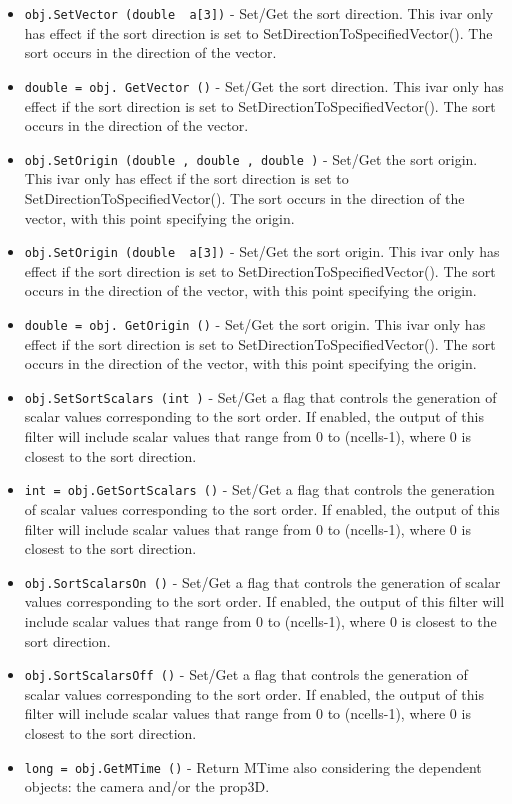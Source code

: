 \begin{itemize}
\item  \verb|obj.SetVector (double  a[3])| -  Set/Get the sort direction. This ivar only has effect if the sort
 direction is set to SetDirectionToSpecifiedVector(). The sort occurs
 in the direction of the vector.

\item  \verb|double = obj. GetVector ()| -  Set/Get the sort direction. This ivar only has effect if the sort
 direction is set to SetDirectionToSpecifiedVector(). The sort occurs
 in the direction of the vector.

\item  \verb|obj.SetOrigin (double , double , double )| -  Set/Get the sort origin. This ivar only has effect if the sort
 direction is set to SetDirectionToSpecifiedVector(). The sort occurs
 in the direction of the vector, with this point specifying the
 origin.

\item  \verb|obj.SetOrigin (double  a[3])| -  Set/Get the sort origin. This ivar only has effect if the sort
 direction is set to SetDirectionToSpecifiedVector(). The sort occurs
 in the direction of the vector, with this point specifying the
 origin.

\item  \verb|double = obj. GetOrigin ()| -  Set/Get the sort origin. This ivar only has effect if the sort
 direction is set to SetDirectionToSpecifiedVector(). The sort occurs
 in the direction of the vector, with this point specifying the
 origin.

\item  \verb|obj.SetSortScalars (int )| -  Set/Get a flag that controls the generation of scalar values
 corresponding to the sort order. If enabled, the output of this
 filter will include scalar values that range from 0 to (ncells-1),
 where 0 is closest to the sort direction.

\item  \verb|int = obj.GetSortScalars ()| -  Set/Get a flag that controls the generation of scalar values
 corresponding to the sort order. If enabled, the output of this
 filter will include scalar values that range from 0 to (ncells-1),
 where 0 is closest to the sort direction.

\item  \verb|obj.SortScalarsOn ()| -  Set/Get a flag that controls the generation of scalar values
 corresponding to the sort order. If enabled, the output of this
 filter will include scalar values that range from 0 to (ncells-1),
 where 0 is closest to the sort direction.

\item  \verb|obj.SortScalarsOff ()| -  Set/Get a flag that controls the generation of scalar values
 corresponding to the sort order. If enabled, the output of this
 filter will include scalar values that range from 0 to (ncells-1),
 where 0 is closest to the sort direction.

\item  \verb|long = obj.GetMTime ()| -  Return MTime also considering the dependent objects: the camera
 and/or the prop3D.

\end{itemize}
